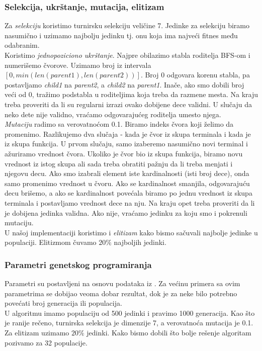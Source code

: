 \documentclass{article}
\begin{document}
\subsubsection{Selekcija, ukrštanje, mutacija, elitizam}
Za \textit{selekciju} koristimo turnirsku selekciju veličine 7. Jedinke
za selekciju biramo nasumično i uzimamo najbolju jedinku tj. onu koja ima najveći fitnes među odabranim. \\
Koristimo \textit{jednopoziciono ukrštanje}. Najpre obilazimo stabla roditelja BFS-om i numerišemo čvorove. Uzimamo broj iz intervala $[0, min(len(parent1), len(parent2))]$. Broj 0 odgovara korenu stabla, pa postavljamo \textit{child1} na \textit{parent2}, a \textit{child2} na \textit{parent1}. Inače, ako smo dobili broj veći od 0, tražimo podstabla u roditeljima koja treba da razmene mesta. Na kraju treba proveriti da li su regularni izrazi ovako dobijene dece validni. U slučaju da neko dete nije validno, vraćamo odgovarajućeg roditelja umesto njega. \\
\textit{Mutaciju} radimo sa verovatnoćom 0.1. Biramo indeks čvora koji želimo da promenimo. Razlikujemo dva slučaja - kada je čvor iz skupa terminala i kada je iz skupa funkcija. U prvom slučaju, samo izaberemo nasumično novi terminal i ažuriramo vrednost čvora.
Ukoliko je čvor bio iz skupa funkcija, biramo novu vrednost iz istog skupa ali sada treba obratiti pažnju da li treba menjati i njegovu decu. Ako smo izabrali element iste kardinalnosti (isti broj dece), onda samo promenimo vrednost u čvoru. Ako se kardinalnost smanjila, odgovarajuću decu brišemo, a ako se kardinalnost povećala biramo po jednu vrednost iz skupa terminala i postavljamo vrednost dece na nju. Na kraju opet treba proveriti da li je dobijena jedinka validna. Ako nije, vraćamo jedinku za koju smo i pokrenuli mutaciju. \\
U našoj implementaciji koristimo i \textit{elitizam} kako bismo sačuvali najbolje jedinke u populaciji. Elitizmom čuvamo $20\%$ najboljih jedinki.

\subsubsection{Parametri genetskog programiranja}
Parametri su postavljeni na osnovu podataka iz \cite{Bartoli}. Za većinu primera sa ovim parametrima se dobijao veoma dobar rezultat, dok je za neke bilo potrebno povećati broj generacija ili populacija. \\
U algoritmu imamo populaciju od 500 jedinki i pravimo 1000 generacija.
Kao što je ranije rečeno, turnirska selekcija je dimenzije 7, a verovatnoća mutacija je 0.1. Za elitizam uzimamo $20\%$ jedinki.
Kako bismo dobili što bolje rešenje algoritam pozivamo za 32 populacije.
\end{document}
